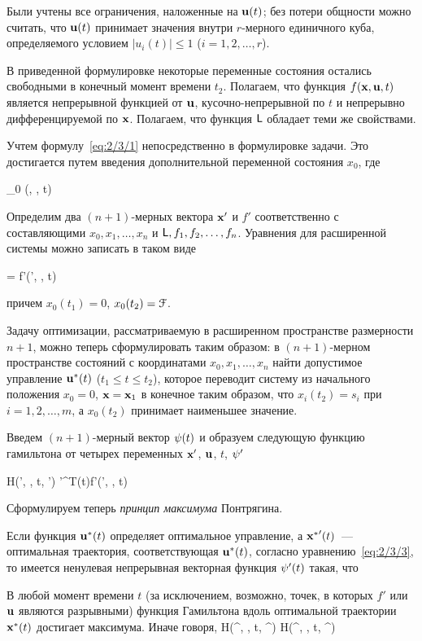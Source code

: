	\item
		Были учтены все ограничения, наложенные на $\mathbf{u}(t)$; без потери общности можно считать, что $\mathbf{u}(t)$ принимает значения внутри $r$-мерного единичного куба, определяемого условием $|u_i(t)| \leqslant 1$ ($i = 1,2,\ldots,r$).
\eenum

В приведенной формулировке некоторые переменные состояния остались свободными в конечный момент времени $t_2$. Полагаем, что функция $f(\mathbf{x}, \mathbf{u}, t)$ является непрерывной функцией от $\mathbf{u}$, кусочно-непрерывной по $t$ и непрерывно дифференцируемой по $\mathbf{x}$. Полагаем, что функция $\mathsf{L}$ обладает теми же свойствами.

Учтем формулу~\ref{eq:2/3/1} непосредственно в формулировке задачи. Это достигается путем введения дополнительной переменной состояния $x_0$, где

    _0 \equiv \funcL(, , t) 
\eeq

Определим два $(n+1)$-мерных вектора $\mathbf{x}'$ и $f'$ соответственно с составляющими $x_0, x_1, \ldots, x_n$ и $\mathsf{L}, f_1, f_2, \ldots, f_n$. Уравнения для расширенной системы можно записать в таком виде

     = f'(', , t) \text{,}
\eeq

причем $x_0(t_1) = 0$, $x_0(t_2) = \mathcal{F}$.

Задачу оптимизации, рассматриваемую в расширенном пространстве размерности $n+1$, можно теперь сформулировать таким образом: в $(n+1)$-мерном пространстве состояний с координатами $x_0, x_1, \ldots, x_n$ найти допустимое управление ${\mathbf{u}^{*}}(t)$ ($t_1 \leqslant t \leqslant t_2$), которое переводит систему из начального положения $x_0 = 0$, $\mathbf{x} = \mathbf{x}_1$ в конечное таким образом, что $x_i(t_2) = s_i$ при $i = 1, 2, \ldots, m$, а $x_0(t_2)$ принимает наименьшее значение.

Введем $(n+1)$-мерный вектор $\mathbf{\psi}(t)$ и образуем следующую функцию гамильтона от четырех переменных $\mathbf{x}'$, $\mathbf{u}$, $t$, $\mathbf{\psi}'$

    H(', , t, \m{\psi}') \eqdef \m{\psi}'^T(t)f'(', , t) 
\eeq

Сформулируем теперь \emph{принцип максимума} Понтрягина.

	Если функция ${\mathbf{u}^{*}}(t)$ определяет оптимальное управление, а ${\mathbf{x}^{*}}^\prime(t)$~--- оптимальная траектория, соответствующая ${\mathbf{u}^{*}}(t)$, согласно уравнению~\ref{eq:2/3/3}, то имеется ненулевая непрерывная векторная функция $\mathbf{\psi}^\prime(t)$ такая, что
	\benum
		\item
			В любой момент времени $t$ (за исключением, возможно, точек, в которых $f'$ или $\mathbf{u}$ являются разрывными) функция Гамильтона вдоль оптимальной траектории ${\mathbf{x}^{*}}(t)$ достигает максимума. Иначе говоря,
			\beqn
				H(\optX^\prime, \optU, t, \m{\psi}^\prime) \geqslant H(\optX^\prime, , t, \m{\psi}^\prime) 
			\eeqn
		
